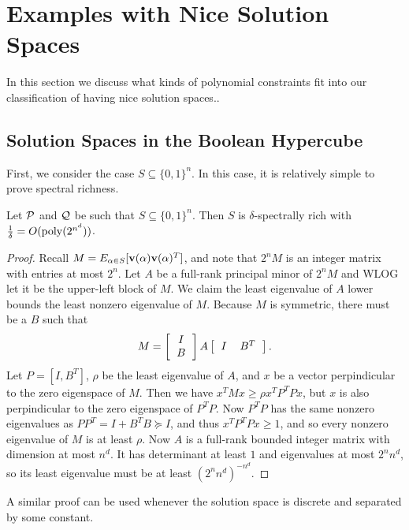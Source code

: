 \section{Examples with Nice Solution Spaces}
\label{sec:nicespaces}
In this section we discuss what kinds of polynomial constraints fit into our classification of having nice solution spaces.. 
\subsection{Solution Spaces in the Boolean Hypercube}
First, we consider the case $S \subseteq \{0,1\}^n$. In this case, it is relatively simple to prove spectral richness.
\begin{lemma}\label{lem:integer-rich}
Let $\mathcal P$ and $\mathcal Q$ be such that $S \subseteq \{0,1\}^n$. Then $S$ is $\delta$-spectrally rich with $\frac{1}{\delta} = O(\operatorname{poly}(2^{n^d}))$.
\end{lemma}
\begin{proof}
Recall $M = E_{\alpha \in S}[{\bf v}(\alpha){\bf v}(\alpha)^T]$, and note that $2^nM$ is an integer matrix with entries at most $2^n$. Let $A$ be a full-rank principal minor of $2^nM$ and WLOG let it be the upper-left block of $M$. We claim the least eigenvalue of $A$ lower bounds the least nonzero eigenvalue of $M$. Because $M$ is symmetric, there must be a $B$ such that
\[M = \left[\begin{tabular}{c} $I$ \\ $B$\end{tabular}\right]A\left[\begin{tabular}{cc} $I$ & $B^T$\end{tabular}\right].\]
Let $P = [I, B^T]$, $\rho$ be the least eigenvalue of $A$, and $x$ be a vector perpindicular to the zero eigenspace of $M$. Then we have $x^TMx \geq \rho x^TP^TPx$,
but $x$ is also perpindicular to the zero eigenspace of $P^TP$. Now $P^TP$ has the same nonzero eigenvalues as $PP^T = I + B^TB \succeq I$, and thus $x^TP^TPx \geq 1$, and so every nonzero eigenvalue of $M$ is at least $\rho$. Now $A$ is a full-rank bounded integer matrix with dimension at most $n^d$. It has determinant at least $1$ and eigenvalues at most $2^nn^d$, so its least eigenvalue must be at least $(2^nn^d)^{-n^d}$.
\end{proof}
A similar proof can be used whenever the solution space is discrete and separated by some constant. 

